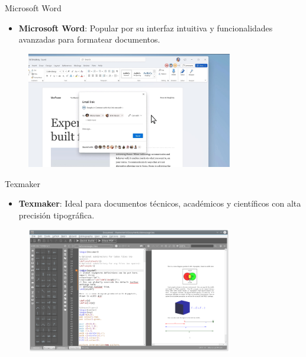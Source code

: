 \documentclass[
11pt, %
]{beamer}
\begin{document}
\begin{frame}{Microsoft Word}
	\begin{itemize}
		\item \textbf{Microsoft Word}: Popular por su interfaz intuitiva y funcionalidades avanzadas para formatear documentos.
	\end{itemize}
	\begin{figure}[h!]
		\centering
		\includegraphics[width=9cm]{screenshot word.jpg}
	\end{figure}
\end{frame}

\begin{frame}{Texmaker}
	\begin{itemize}
		\item \textbf{Texmaker}: Ideal para documentos técnicos, académicos y científicos con alta precisión tipográfica.
	\end{itemize}
	\begin{figure}[h!]
		\centering
		\includegraphics[width=9cm]{screenshot texmaker.png}
	\end{figure}
\end{frame}
\end{document}
